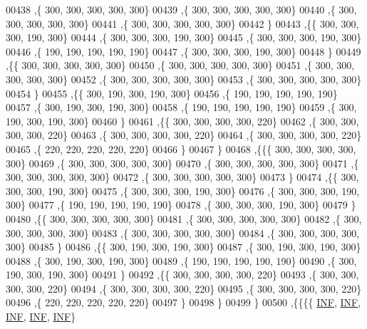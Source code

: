 \begin{DoxyCode}
00438    ,\{   300,   300,   300,   300,   300\}
00439    ,\{   300,   300,   300,   300,   300\}
00440    ,\{   300,   300,   300,   300,   300\}
00441    ,\{   300,   300,   300,   300,   300\}
00442    \}
00443   ,\{\{   300,   300,   300,   190,   300\}
00444    ,\{   300,   300,   300,   190,   300\}
00445    ,\{   300,   300,   300,   190,   300\}
00446    ,\{   190,   190,   190,   190,   190\}
00447    ,\{   300,   300,   300,   190,   300\}
00448    \}
00449   ,\{\{   300,   300,   300,   300,   300\}
00450    ,\{   300,   300,   300,   300,   300\}
00451    ,\{   300,   300,   300,   300,   300\}
00452    ,\{   300,   300,   300,   300,   300\}
00453    ,\{   300,   300,   300,   300,   300\}
00454    \}
00455   ,\{\{   300,   190,   300,   190,   300\}
00456    ,\{   190,   190,   190,   190,   190\}
00457    ,\{   300,   190,   300,   190,   300\}
00458    ,\{   190,   190,   190,   190,   190\}
00459    ,\{   300,   190,   300,   190,   300\}
00460    \}
00461   ,\{\{   300,   300,   300,   300,   220\}
00462    ,\{   300,   300,   300,   300,   220\}
00463    ,\{   300,   300,   300,   300,   220\}
00464    ,\{   300,   300,   300,   300,   220\}
00465    ,\{   220,   220,   220,   220,   220\}
00466    \}
00467   \}
00468  ,\{\{\{   300,   300,   300,   300,   300\}
00469    ,\{   300,   300,   300,   300,   300\}
00470    ,\{   300,   300,   300,   300,   300\}
00471    ,\{   300,   300,   300,   300,   300\}
00472    ,\{   300,   300,   300,   300,   300\}
00473    \}
00474   ,\{\{   300,   300,   300,   190,   300\}
00475    ,\{   300,   300,   300,   190,   300\}
00476    ,\{   300,   300,   300,   190,   300\}
00477    ,\{   190,   190,   190,   190,   190\}
00478    ,\{   300,   300,   300,   190,   300\}
00479    \}
00480   ,\{\{   300,   300,   300,   300,   300\}
00481    ,\{   300,   300,   300,   300,   300\}
00482    ,\{   300,   300,   300,   300,   300\}
00483    ,\{   300,   300,   300,   300,   300\}
00484    ,\{   300,   300,   300,   300,   300\}
00485    \}
00486   ,\{\{   300,   190,   300,   190,   300\}
00487    ,\{   300,   190,   300,   190,   300\}
00488    ,\{   300,   190,   300,   190,   300\}
00489    ,\{   190,   190,   190,   190,   190\}
00490    ,\{   300,   190,   300,   190,   300\}
00491    \}
00492   ,\{\{   300,   300,   300,   300,   220\}
00493    ,\{   300,   300,   300,   300,   220\}
00494    ,\{   300,   300,   300,   300,   220\}
00495    ,\{   300,   300,   300,   300,   220\}
00496    ,\{   220,   220,   220,   220,   220\}
00497    \}
00498   \}
00499  \}
00500 ,\{\{\{\{   \mbox{\hyperlink{1_88_84__epars_8h_a12c2040f25d8e3a7b9e1c2024c618cb6}{INF}},   \mbox{\hyperlink{1_88_84__epars_8h_a12c2040f25d8e3a7b9e1c2024c618cb6}{INF}},   \mbox{\hyperlink{1_88_84__epars_8h_a12c2040f25d8e3a7b9e1c2024c618cb6}{INF}},   \mbox{\hyperlink{1_88_84__epars_8h_a12c2040f25d8e3a7b9e1c2024c618cb6}{INF}},   \mbox{\hyperlink{1_88_84__epars_8h_a12c2040f25d8e3a7b9e1c2024c618cb6}{INF}}\}

\end{DoxyCode}
